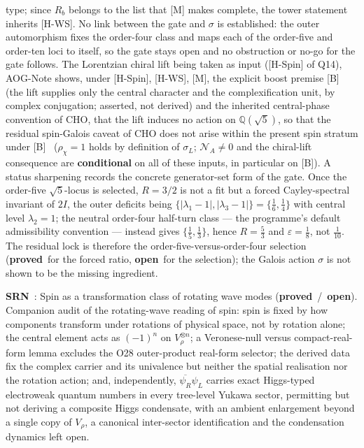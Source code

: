 \documentclass[11pt,a4paper]{article}
\newcommand{\sproved}{\textcolor{cproved}{\textbf{proved}}}
\newcommand{\sopen}{\textcolor{copen}{\textbf{open}}}
\newcommand{\scond}{\textcolor{ccond}{\textbf{conditional}}}
\begin{document}
    type; since $R_b$ belongs to the list that [M] makes complete, the tower statement inherits [H-WS].
    No link between the gate and $\sigma$ is established: the outer automorphism fixes the order-four class and maps
    each of the order-five and order-ten loci to itself, so the gate stays open and no obstruction or no-go for the
    gate follows.
    The Lorentzian chiral lift being taken as input ([H-Spin] of Q14), AOG-Note shows, under [H-Spin], [H-WS], [M], the
    explicit boost premise [B] (the lift supplies only the central character and the complexification unit, by complex
    conjugation; asserted, not derived) and the inherited central-phase convention of CHO, that the lift induces no
    action on $\mathbb{Q}(\sqrt{5})$, so that the residual spin-Galois caveat of CHO does not arise within the present
    spin stratum under [B]~\cite{Beau2026cho}
    ($\rho_\chi = 1$ holds by definition of $\sigma_L$; $\mathcal{N}_A\neq0$ and the chiral-lift consequence are
    \scond{} on all of these inputs, in particular on [B]).
    A status sharpening records the concrete generator-set form of the gate.
    Once the order-five $\sqrt{5}$-locus is selected, $R = 3/2$ is not a fit but a forced Cayley-spectral invariant of
    $2I$, the outer deficits being $\{|\lambda_1-1|,|\lambda_3-1|\} = \{\tfrac16,\tfrac14\}$ with central level
    $\lambda_2 = 1$; the neutral order-four half-turn class --- the programme's default admissibility convention ---
    instead gives $\{\tfrac15,\tfrac13\}$, hence $R = \tfrac53$ and $\varepsilon = \tfrac18$, not $\tfrac1{10}$.
    The residual lock is therefore the order-five-versus-order-four selection (\sproved\ for the forced ratio, \sopen\
    for the selection); the Galois action $\sigma$ is not shown to be the missing ingredient.

    \textbf{SRN}~\cite{Beau2026srn}: Spin as a transformation class of rotating wave modes (\sproved\ /\ \sopen).
    Companion audit of the rotating-wave reading of spin: spin is fixed by how components transform under
    rotations of physical space, not by rotation alone; the central element acts as $(-1)^n$ on
    $V_\rho^{\otimes n}$; a Veronese-null versus compact-real-form lemma excludes the O28 outer-product real-form
    selector; the derived data fix the complex carrier and its univalence but neither the spatial realisation nor
    the rotation action; and, independently, $\overline{\psi_R}\psi_L$ carries exact Higgs-typed electroweak
    quantum numbers in every tree-level Yukawa sector, permitting but not deriving a composite Higgs condensate,
    with an ambient enlargement beyond a single copy of $V_\rho$, a canonical inter-sector identification and the
    condensation dynamics left open.
\end{document}
